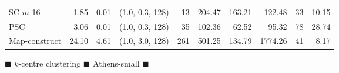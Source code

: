 \documentclass[11pt]{article}
\begin{document}
\begin{figure}[h]
\begin{center}
\begin{minipage}{\textwidth}
{\begin{tabular}{@{}lrrcrrrrrr@{}}
        SC-$m$-16 & 1.85 & 0.01 & (1.0, 0.3, 128) & 13 & 204.47 & 163.21 & 122.48 & 33 & 10.15\\
        PSC & 3.06 & 0.01 & (1.0, 0.3, 128) & 35 & 102.36 & 62.52 & 95.32 & 78 & 28.74\\
        Map-construct & 24.10 & 4.61 & (1.0, 3.0, 128) & 261 & 501.25 & 134.79 & 1774.26 & 41 & 8.17\\
        \bottomrule
    \end{tabular}}
\end{minipage}
        \caption{$\blacksquare$ $k$-centre clustering $\blacksquare$ Athens-small  $\blacksquare$}
    \end{center} \end{figure}
\clearpage
\newpage 
%
\clearpage
\end{document}
